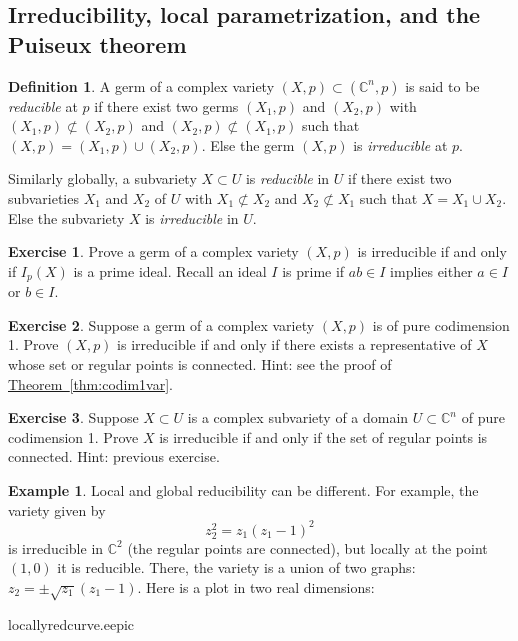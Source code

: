 \documentclass[12pt,openany]{book}
\newcommand{\C}{{\mathbb{C}}}
\newcommand{\myindex}[1]{#1\index{#1}}
\theoremstyle{plain}
\theoremstyle{remark}
\theoremstyle{definition}
\newtheorem{defn}[thm]{Definition}
\newenvironment{exbox}{%
    \def\FrameCommand{\vrule width 1pt \relax\hspace {10pt}}%
    \MakeFramed {\advance \hsize -\width \FrameRestore }%
}{%
    \endMakeFramed
}
\theoremstyle{exercise}
\newtheorem{exercise}{Exercise}[section]
\theoremstyle{example}
\newtheorem{example}[thm]{Example}
\newcommand{\thmref}[1]{\hyperref[#1]{Theorem~\ref*{#1}}}
\begin{document}
\subsection{Irreducibility, local parametrization, and the Puiseux
theorem}

\begin{defn}
A germ of a complex variety $(X,p) \subset (\C^n,p)$ is said to be
\emph{\myindex{reducible}} at $p$ if there exist
two germs $(X_1,p)$ and $(X_2,p)$ with
$(X_1,p) \not\subset (X_2,p)$ and
$(X_2,p) \not\subset (X_1,p)$ such that
$(X,p) = (X_1,p) \cup (X_2,p)$.
Else the germ $(X,p)$ is \emph{\myindex{irreducible}} at $p$.

Similarly globally, a subvariety $X \subset U$ is
\emph{reducible} in $U$ if there exist
two subvarieties
$X_1$ and $X_2$ of $U$ with
$X_1 \not\subset X_2$ and
$X_2 \not\subset X_1$ such that
$X = X_1 \cup X_2$.
Else the subvariety $X$ is \emph{irreducible} in $U$.
\end{defn}

\begin{exbox}
\begin{exercise}
Prove a germ of a complex variety $(X,p)$ is irreducible if and only if $I_p(X)$ is a prime ideal.
Recall an ideal $I$ is prime if $ab \in I$ implies either $a \in I$ or $b
\in I$.
\end{exercise}

\begin{exercise}
Suppose a germ of a complex variety $(X,p)$ is of pure codimension 1.
Prove $(X,p)$ is irreducible if and only if there
exists a representative of $X$ whose set or regular points
is connected.  Hint: see the proof of \thmref{thm:codim1var}.
\end{exercise}

\begin{exercise}
Suppose $X \subset U$ is a complex subvariety of a domain $U \subset \C^n$
of pure codimension 1.
Prove $X$ is irreducible if and only if the set of regular points
is connected.  Hint: previous exercise.
\end{exercise}
\end{exbox}

\begin{example}
Local and global reducibility can be different.  For example,
the variety given by
\begin{equation*}
z_2^2 = z_1{(z_1-1)}^2
\end{equation*}
is irreducible in $\C^2$ (the regular points are connected), but locally
at the point
$(1,0)$ it is reducible.  There, the variety is
a union of two graphs: $z_2 = \pm \sqrt{z_1}(z_1-1)$.
Here is a plot in two real dimensions:

\begin{center}
\medskip
{locallyredcurve.eepic}
\bigskip
\end{center}
\end{example}
\end{document}
